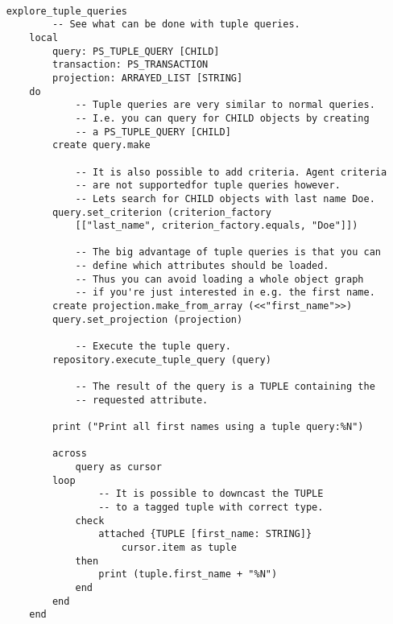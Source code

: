 \documentclass[a4paper,12pt]{report}
\begin{document}
\begin{lstlisting}[language=OOSC2Eiffel, captionpos=b, caption={Using tuple queries.}, label={lst:tuple_query_simple}]

	explore_tuple_queries
			-- See what can be done with tuple queries.
		local
			query: PS_TUPLE_QUERY [CHILD]
			transaction: PS_TRANSACTION
			projection: ARRAYED_LIST [STRING]
		do
				-- Tuple queries are very similar to normal queries.
				-- I.e. you can query for CHILD objects by creating
				-- a PS_TUPLE_QUERY [CHILD]
			create query.make

				-- It is also possible to add criteria. Agent criteria 
				-- are not supportedfor tuple queries however.
				-- Lets search for CHILD objects with last name Doe.
			query.set_criterion (criterion_factory 
				[["last_name", criterion_factory.equals, "Doe"]])

				-- The big advantage of tuple queries is that you can 
				-- define which attributes should be loaded. 
				-- Thus you can avoid loading a whole object graph
				-- if you're just interested in e.g. the first name.
			create projection.make_from_array (<<"first_name">>)
			query.set_projection (projection)

				-- Execute the tuple query.
			repository.execute_tuple_query (query)

				-- The result of the query is a TUPLE containing the 
				-- requested attribute.

			print ("Print all first names using a tuple query:%N")
			
			across
				query as cursor
			loop
					-- It is possible to downcast the TUPLE 
					-- to a tagged tuple with correct type.
				check 
					attached {TUPLE [first_name: STRING]} 
						cursor.item as tuple 
				then
					print (tuple.first_name + "%N")
				end
			end
		end
\end{lstlisting}



\end{document}

